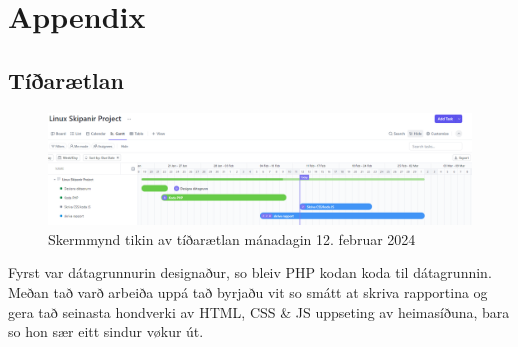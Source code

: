 \documentclass{article}
\begin{document}
\section{Appendix}

\subsection{Tíðarætlan}
\begin{figure}[H]
    \includegraphics[width=\linewidth]{tíðarætlan.png}
    \caption{Skermmynd tikin av tíðarætlan mánadagin 12. februar 2024}
    \label{fig:tíðarætlan.png}
\end{figure}

\par Fyrst var dátagrunnurin designaður, so bleiv PHP kodan koda til dátagrunnin.
Meðan tað varð arbeiða uppá tað byrjaðu vit so smátt at skriva rapportina og gera tað
seinasta hondverki av HTML, CSS \& JS uppseting av heimasíðuna, bara so hon sær eitt sindur
vøkur út.


{}


{}


{}


{}

\end{document}
